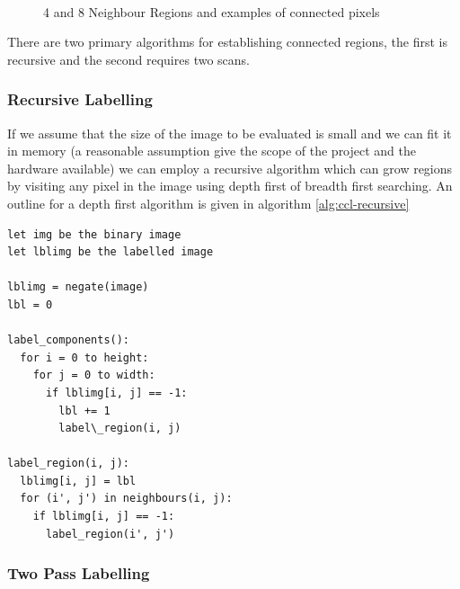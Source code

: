 \begin{figure}[h!]
  \centering
  \quad
  \\
  \quad

  \caption{4 and 8 Neighbour Regions and examples of connected pixels}
  \label{fig:pixel-neighbours}
\end{figure}

There are two primary algorithms for establishing connected regions, the first is recursive and the second requires two scans.

\subsubsection{Recursive Labelling}

If we assume that the size of the image to be evaluated is small and we can fit it in memory (a reasonable assumption give the scope of the project and the hardware available) we can employ a recursive algorithm which can grow regions by visiting any pixel in the image using depth first of breadth first searching. An outline for a depth first algorithm is given in algorithm \ref{alg:ccl-recursive}

\begin{lstlisting}[caption=Recursive Connected Component Labelling (DFS), label=alg:ccl-recursive]
let img be the binary image
let lblimg be the labelled image

lblimg = negate(image)
lbl = 0

label_components():
  for i = 0 to height:
    for j = 0 to width:
      if lblimg[i, j] == -1:
        lbl += 1
        label\_region(i, j)

label_region(i, j):
  lblimg[i, j] = lbl
  for (i', j') in neighbours(i, j):
    if lblimg[i, j] == -1:
      label_region(i', j')
\end{lstlisting}

\subsubsection{Two Pass Labelling}

